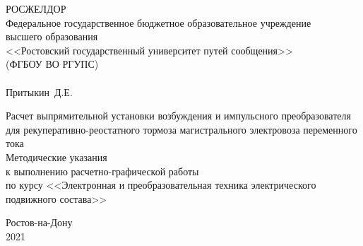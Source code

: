 \begin{titlepage}
 
 \begin{center}

 \small РОСЖЕЛДОР \\
  Федеральное государственное бюджетное образовательное учреждение \\
высшего образования \\ <<Ростовский государственный 
университет путей сообщения>> \\ (ФГБОУ ВО РГУПС) \\[0.5cm]
 \hrulefill \\
 \large Притыкин~Д.Е. \\[3cm]
\end{center}
 
\begin{center}
 
 
 \Large Расчет выпрямительной установки возбуждения и импульсного преобразователя для рекуперативно-реостатного тормоза магистрального электровоза переменного тока \\[3cm]
 \Large Методические указания \\ 
 \large к выполнению расчетно-графической работы \\
 по курсу <<Электронная и преобразовательная техника электрического подвижного состава>>

\end{center} 

\vfill

\begin{center}
 \large Ростов-на-Дону \\
 2021
\end{center}

 
\end{titlepage}
